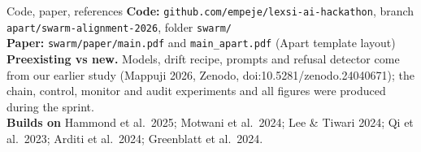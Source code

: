 \documentclass[aspectratio=169,11pt]{beamer}
\begin{document}
\begin{frame}{Code, paper, references}
\small
\textbf{Code:} \texttt{github.com/empeje/lexsi-ai-hackathon}, branch \texttt{apart/swarm-alignment-2026}, folder \texttt{swarm/}\\
\textbf{Paper:} \texttt{swarm/paper/main.pdf} and \texttt{main\_apart.pdf} (Apart template layout)\\[8pt]
\textbf{Preexisting vs new.} Models, drift recipe, prompts and refusal detector come from our earlier study (Mappuji 2026, Zenodo, doi:10.5281/zenodo.24040671); the chain, control, monitor and audit experiments and all figures were produced during the sprint.\\[8pt]
\textbf{Builds on} Hammond et al.\ 2025; Motwani et al.\ 2024; Lee \& Tiwari 2024; Qi et al.\ 2023; Arditi et al.\ 2024; Greenblatt et al.\ 2024.
\end{frame}
\end{document}
